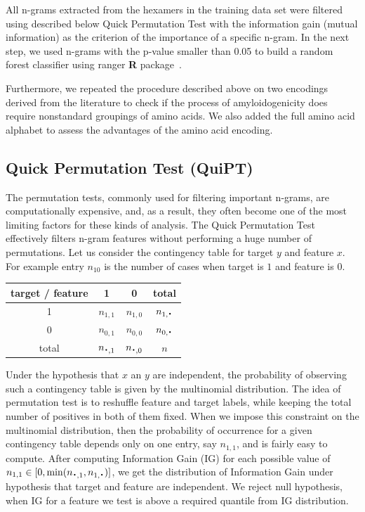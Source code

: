 \documentclass[a4,center,fleqn]{NAR}
\newcommand*{\bigcdot}{\raisebox{-0.25ex}{\scalebox{1.5}{$\cdot$}}}
\begin{document}
  All n-grams extracted from the hexamers in the training data set were filtered 
using described below Quick Permutation Test with the information gain (mutual 
information) as the criterion of the importance of a specific n-gram. In the 
next step, we used n-grams with the p-value smaller than 0.05 to build a random 
forest classifier using ranger \textbf{R} package~\citep{wright_ranger:_2015}. 

  Furthermore, we repeated the procedure described above on two encodings 
derived from the literature to check if the process of amyloidogenicity does 
require nonstandard groupings of amino acids. We also added the full amino acid 
alphabet to assess the advantages of the amino acid encoding.

\subsection{Quick Permutation Test (QuiPT)}

The permutation tests, commonly used for filtering important n-grams, are 
computationally expensive, and, as a result, they often become one of the most
limiting factors for these kinds of analysis. 
The Quick Permutation Test effectively filters 
n-gram features without performing a huge number of permutations. Let us 
consider the contingency table for target $y$ and feature $x$. For example 
entry $n_{10}$ is the number of cases when target is $1$ and feature is $0$.

\begin{center}
\begin{tabular}{ | c || c | c | c | }
  \hline			
  target / feature & 1 & 0 & total\\ \hline
 1 & $n_{1,1}$ & $n_{1,0}$ & $n_{1,\bigcdot}$ \\
 0 & $n_{0,1}$ & $n_{0,0}$ & $n_{0,\bigcdot}$ \\ \hline
 total & $n_{\bigcdot,1}$ & $n_{\bigcdot,0}$ & $n$ \\
  \hline  
\end{tabular} 
\end{center}

  Under the hypothesis that $x$ an $y$ are independent, the probability of 
observing such a contingency table is given by the multinomial distribution. The 
idea of permutation test is to reshuffle feature and target labels, while 
keeping the total number of positives in both of them fixed. When we impose this 
constraint on the multinomial distribution, then the probability of occurrence 
for a given contingency table depends only on one entry, say $n_{1,1}$, and is 
fairly easy to compute. After computing Information Gain (IG) for each possible 
value of $n_{1,1} \in [0,\min(n_{\bigcdot, 1}, n_{1, \bigcdot})]$, we get the 
distribution of Information Gain under hypothesis that target and feature are 
independent. We reject null hypothesis, when IG for a feature we test is above a 
required quantile from IG distribution.
\end{document}

